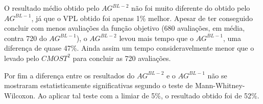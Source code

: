 O resultado médio obtido pelo $AG^{BL-2}$ não foi muito diferente do obtido pelo $AG^{BL-1}$, já que o VPL obtido foi apenas 1\% melhor. Apesar de ter conseguido concluir com menos avaliações da função objetivo (680 avaliações, em média, contra 720 do $AG^{BL-1}$), o $AG^{BL-2}$ levou mais tempo que o $AG^{BL-1}$, uma diferença de quase 47\%. Ainda assim um tempo consideravelmente menor que o levado pelo $CMOST^{2}$ para concluir as 720 avaliações.

Por fim a diferença entre os resultados do $AG^{BL-2}$ e o $AG^{BL-1}$ não se mostraram estatisticamente significativas segundo o teste de Mann-Whitney-Wilcoxon. Ao aplicar tal teste com a limiar de 5\%, o resultado obtido foi de 52\%.
